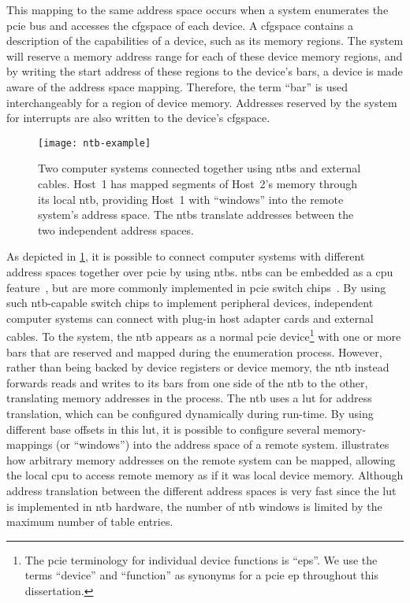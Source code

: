 This mapping to the same address space occurs when a system enumerates the \gls{pcie} bus and accesses the \gls{cfgspace} of each device.
%
A \gls{cfgspace} contains a description of the capabilities of a device, such as its memory regions.
%
The system will reserve a memory address range for each of these device memory regions, and by writing the start address of these regions to the device's \glspl{bar}, a device is made aware of the address space mapping.
%
Therefore, the term ``\gls{bar}'' is used interchangeably for a region of device memory.
%
Addresses reserved by the system for interrupts are also written to the device's \gls{cfgspace}.



\begin{figure}[!b]
    \centering
    \texttt{[image: ntb-example]}
    \caption[Two computer systems connected using , and the  translate between the two different address domains]
    {Two computer systems connected together using \glspl{ntb} and external cables. Host~1 has mapped segments of Host~2's memory through its local \gls{ntb}, providing Host~1 with ``windows'' into the remote system's address space. The \glspl{ntb} translate addresses between the two independent address spaces.}
    \label{fig:ntb-example}
\end{figure}



As depicted in \cref{fig:ntb-example}, it is possible to connect computer systems with different address spaces together over \gls{pcie} by using \glspl{ntb}.
%
\Glspl{ntb} can be embedded as a \gls{cpu} feature~\cite{whitepaper:Sullivan2010,url:LinuxNTB-AMD}, but are more commonly implemented in \gls{pcie} switch chips~\cite{whitepaper:PLX,pex8733}.
%
By using such \gls{ntb}-capable switch chips to implement peripheral devices, independent computer systems can connect with plug-in host adapter cards and external cables.
%
To the system, the \gls{ntb} appears as a normal \gls{pcie} device\footnote{The \gls{pcie} terminology for individual device functions is ``\glspl{ep}''. We use the terms ``device'' and ``function'' as synonyms for a \gls{pcie} \gls{ep} throughout this dissertation.} with one or more \glspl{bar} that are reserved and mapped during the enumeration process.
%
However, rather than being backed by device registers or device memory, the \gls{ntb} instead forwards reads and writes to its \glspl{bar} from one side of the \gls{ntb} to the other, translating memory addresses in the process.
%
The \gls{ntb} uses a \gls{lut} for address translation, which can be configured dynamically during run-time.
%
By using different base offsets in this \gls{lut}, it is possible to configure several memory-mappings (or ``windows'') into the address space of a remote system.
%
 illustrates how arbitrary memory addresses on the remote system can be mapped, allowing the local \gls{cpu} to access remote memory as if it was local device memory.
%
Although address translation between the different address spaces is very fast since the \gls{lut} is implemented in \gls{ntb} hardware, the number of \gls{ntb} windows is limited by the maximum number of table entries.



